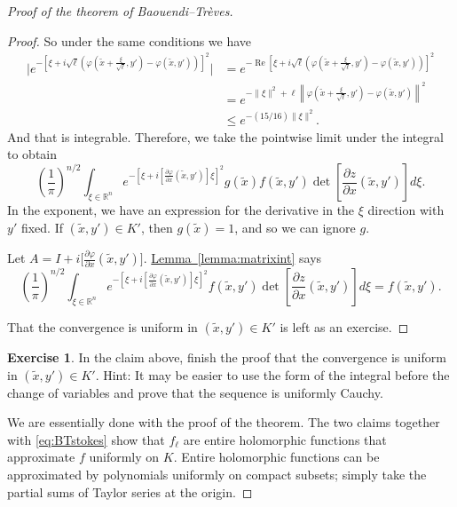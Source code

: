 \documentclass[12pt,openany]{book}
\renewcommand{\Re}{\operatorname{Re}}
\newcommand{\snorm}[1]{\lVert {#1} \rVert}
\newcommand{\bbabs}[1]{\biggl\lvert {#1} \biggr\rvert}
\newcommand{\norm}[1]{\left\lVert {#1} \right\rVert}
\newcommand{\R}{{\mathbb{R}}}
\theoremstyle{plain}
\theoremstyle{remark}
\theoremstyle{definition}
\newenvironment{exbox}{%
    \def\FrameCommand{\vrule width 1pt \relax\hspace{10pt}}%
    \MakeFramed {\advance \hsize -\width \FrameRestore}%
}{%
    \endMakeFramed
}
\theoremstyle{exercise}
\newtheorem{exercise}{Exercise}[section]
\theoremstyle{example}
\newcommand{\lemmaref}[1]{\hyperref[#1]{Lemma~\ref*{#1}}}
\begin{document}
\begin{proof}[Proof of the theorem of Baouendi--Tr{\`e}ves]
\begin{proof}
So under the same conditions we have
\begin{equation*}
\begin{split}
\bbabs{e^{-{\left[\xi +
i\sqrt{\ell}\left(\varphi\left(\tilde{x}+\frac{\xi}{\sqrt{\ell}},y'\right) -
\varphi(\tilde{x},y')\right)\right]}^2}}
& =
e^{-\Re {\left[\xi +
i\sqrt{\ell}\left(\varphi\left(\tilde{x}+\frac{\xi}{\sqrt{\ell}},y'\right) -
\varphi(\tilde{x},y')\right)\right]}^2}
\\
& =
e^{-\snorm{\xi}^2 + \ell
\norm{\varphi\left(\tilde{x}+\frac{\xi}{\sqrt{\ell}},y'\right) -
\varphi(\tilde{x},y')}^2}
\\
& \leq
e^{-(15/16)\snorm{\xi}^2} .
\end{split}
\end{equation*}
And that is integrable.  Therefore, we take the pointwise limit under the integral to obtain 
\begin{equation*}
{\left(\frac{1}{\pi}\right)}^{n/2}
\int_{\xi \in \R^n}
e^{-{\left[\xi + i\left[ \frac{\partial \varphi}{\partial x}(\tilde{x},y') \right] \xi \right]}^2}
g(\tilde{x})
f(\tilde{x},y')
\det \left[\frac{\partial z}{\partial
x}(\tilde{x},y')\right] d\xi .
\end{equation*}
In the exponent, we have an expression for the derivative
in the $\xi$ direction with $y'$ fixed.  If $(\tilde{x},y') \in K'$, then
$g(\tilde{x}) = 1$, and so we can ignore $g$.

Let $A = I + i \bigl[ \frac{\partial \varphi}{\partial x}(\tilde{x},y')
\bigr]$.  \lemmaref{lemma:matrixint} says
\begin{equation*}
{\left(\frac{1}{\pi}\right)}^{n/2}
\int_{\xi \in \R^n}
e^{-{\left[\xi + i\left[ \frac{\partial \varphi}{\partial x}(\tilde{x},y') \right] \xi \right]}^2}
f(\tilde{x},y')
\det \left[\frac{\partial z}{\partial
x}(\tilde{x},y')\right] d\xi  = f(\tilde{x},y') .
\end{equation*}

That the convergence is uniform in
$(\tilde{x},y') \in K'$ is left as an exercise.
\end{proof}

\begin{exbox}
\begin{exercise}
In the claim above, finish the proof that the convergence is 
uniform in $(\tilde{x},y') \in K'$.
Hint: It may be easier to
use the form of the integral before the change of variables
and prove that the sequence is uniformly Cauchy.
\end{exercise}
\end{exbox}

We are essentially done with the proof of the theorem.
The two claims together with \eqref{eq:BTstokes} show that $f_\ell$ are entire
holomorphic functions that approximate $f$ uniformly on $K$.  Entire holomorphic
functions can be approximated by polynomials uniformly on compact subsets;
simply take the partial sums of Taylor series at the origin.
\end{proof}
\end{document}

